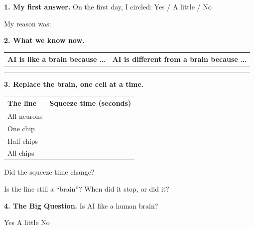 \documentclass[11pt]{article}
\begin{document}
\partner

\vspace{0.4em}
{\large\textbf{1. My first answer.}} On the first day, I circled: Yes / A little / No

\vspace{0.5em}
My reason was: 

\vspace{1.0em}
{\large\textbf{2. What we know now.}}

\vspace{0.3em}
\begin{tabular}{|R{3.25in}|R{3.25in}|}
\hline
\textbf{AI is like a brain because \dots} & \textbf{AI is different from a brain because \dots} \\ \hline
{} &  \\[1.2em] \hline
{} &  \\[1.2em] \hline
\end{tabular}

\vspace{1.0em}
{\large\textbf{3. Replace the brain, one cell at a time.}}

\vspace{0.3em}
\begin{tabular}{|R{3.0in}|c|}
\hline
\textbf{The line} & \textbf{Squeeze time (seconds)} \\ \hline
All neurons & \\ \hline
One chip & \\ \hline
Half chips & \\ \hline
All chips & \\ \hline
\end{tabular}

\vspace{0.6em}
Did the squeeze time change? 

\vspace{0.6em}
Is the line still a ``brain''? When did it stop, or did it? 

\vspace{0.5em}
\blank{6.9in}

\newpage

{\large\textbf{4. The Big Question.}} Is AI like a human brain?

\vspace{0.6em}
\begin{center}{\Large Yes \qquad A little \qquad No}\end{center}
\end{document}
